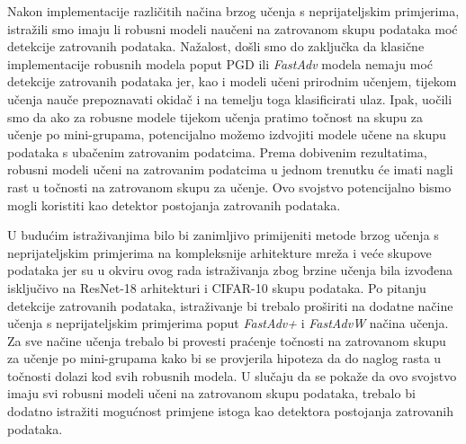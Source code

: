\documentclass[times, utf8, zavrsni, numeric]{fer}
\begin{document}
Nakon implementacije različitih načina brzog učenja s neprijateljskim primjerima, istražili smo imaju li robusni modeli naučeni na zatrovanom skupu podataka moć detekcije zatrovanih podataka.
Nažalost, došli smo do zaključka da klasične implementacije robusnih modela poput PGD ili \textit{FastAdv} modela nemaju moć detekcije zatrovanih podataka jer, kao i modeli učeni prirodnim učenjem, 
tijekom učenja nauče prepoznavati okidač i na temelju toga klasificirati ulaz. 
Ipak, uočili smo da ako za robusne modele tijekom učenja pratimo točnost na skupu za učenje po mini-grupama, potencijalno možemo izdvojiti modele učene na skupu podataka s ubačenim zatrovanim podatcima.
Prema dobivenim rezultatima, robusni modeli učeni na zatrovanim podatcima u jednom trenutku će imati nagli rast u točnosti na zatrovanom skupu za učenje. Ovo svojstvo potencijalno bismo mogli koristiti kao detektor postojanja zatrovanih podataka.

\pagebreak

U budućim istraživanjima bilo bi zanimljivo primijeniti metode brzog učenja s neprijateljskim primjerima na kompleksnije arhitekture mreža i veće skupove podataka 
jer su u okviru ovog rada istraživanja zbog brzine učenja bila izvođena isključivo na ResNet-18 arhitekturi i CIFAR-10 skupu podataka. 
Po pitanju detekcije zatrovanih podataka, istraživanje bi trebalo proširiti na dodatne načine učenja s neprijateljskim primjerima poput \textit{FastAdv+} i \textit{FastAdvW} načina učenja.
Za sve načine učenja trebalo bi provesti praćenje točnosti na zatrovanom skupu za učenje po mini-grupama kako bi se provjerila hipoteza da do naglog rasta u točnosti dolazi kod svih robusnih modela.
U slučaju da se pokaže da ovo svojstvo imaju svi robusni modeli učeni na zatrovanom skupu podataka, trebalo bi dodatno istražiti mogućnost primjene istoga kao detektora postojanja zatrovanih podataka.



\end{document}
